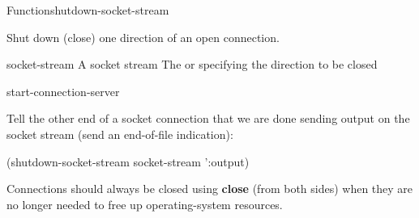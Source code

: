 \documentclass[10pt,twoside,english,pdftex]{article}
\begin{document}

\begin{functiondoc}{Function}{shutdown-socket-stream}%
  {}
%
%

\fnsyntax

\fnpurpose Shut down (close) one direction of an open connection.

\fnpackage {}

\fnmodule {}

\fnargs
\begin{args}{socket-stream}
 A socket stream
\arg[direction] The   or  
specifying the direction to be closed
\end{args}

\begin{alsos}{start-connection-server}
\end{alsos}

\fnexample
Tell the other end of a socket connection that we are done sending
output on the socket stream (send an end-of-file indication):
%
\W\supp
\begin{example}
  (shutdown-socket-stream socket-stream ':output)
\end{example}

\fnnote Connections should always be closed using \textbf{close} (from
both sides) when they are no longer needed to free up operating-system
resources.

\end{functiondoc}

\end{document}
